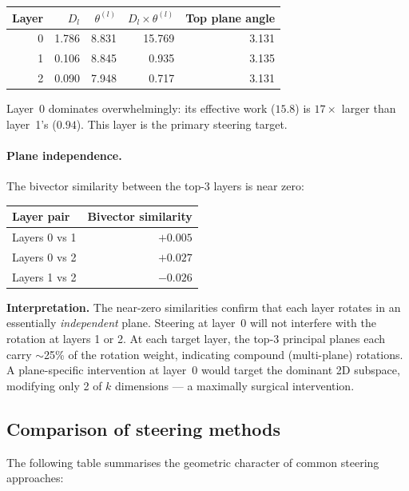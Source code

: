 \documentclass[11pt, twoside, openright]{memoir}
\begin{document}
\begin{center}
\renewcommand{\arraystretch}{1.3}\small
\begin{tabular}{@{}r r r r r@{}}
\toprule
\textbf{Layer} & $D_l$ & $\theta^{(l)}$ &
  $D_l \times \theta^{(l)}$ & \textbf{Top plane angle} \\
\midrule
0 & 1.786 & 8.831 & 15.769 & 3.131 \\
1 & 0.106 & 8.845 & 0.935 & 3.135 \\
2 & 0.090 & 7.948 & 0.717 & 3.131 \\
\bottomrule
\end{tabular}
\end{center}

Layer~0 dominates overwhelmingly: its effective work ($15.8$) is
$17\times$ larger than layer~1's ($0.94$).  This layer is the primary
steering target.

\paragraph{Plane independence.}
The bivector similarity between the top-3 layers is near zero:
\begin{center}
\renewcommand{\arraystretch}{1.3}\small
\begin{tabular}{@{}l r@{}}
\toprule
\textbf{Layer pair} & \textbf{Bivector similarity} \\
\midrule
Layers 0 vs 1 & $+0.005$ \\
Layers 0 vs 2 & $+0.027$ \\
Layers 1 vs 2 & $-0.026$ \\
\bottomrule
\end{tabular}
\end{center}

\textbf{Interpretation.}
The near-zero similarities confirm that each layer rotates in an
essentially \emph{independent} plane.  Steering at layer~0 will not
interfere with the rotation at layers 1 or 2.  At each target layer,
the top-3 principal planes each carry $\sim$25\% of the rotation
weight, indicating compound (multi-plane) rotations.  A plane-specific
intervention at layer~0 would target the dominant 2D subspace,
modifying only 2 of $k$ dimensions --- a maximally surgical intervention.

\subsection{Comparison of steering methods}

The following table summarises the geometric character of common
steering approaches:
\end{document}
